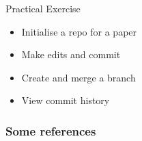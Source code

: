 \documentclass[12pt,t]{beamer}
\begin{document}
\begin{frame}{Practical Exercise}
\begin{itemize}
    \item Initialise a repo for a paper
		\vspace{1em}
		\pause
    \item Make edits and commit
		\vspace{1em}
		\pause
    \item Create and merge a branch
		\vspace{1em}
		\pause
    \item View commit history
\end{itemize}
\end{frame}

\begin{frame}[allowframebreaks]\frametitle{Some references}
\nocite{*}


\end{frame}

		
\end{document}
